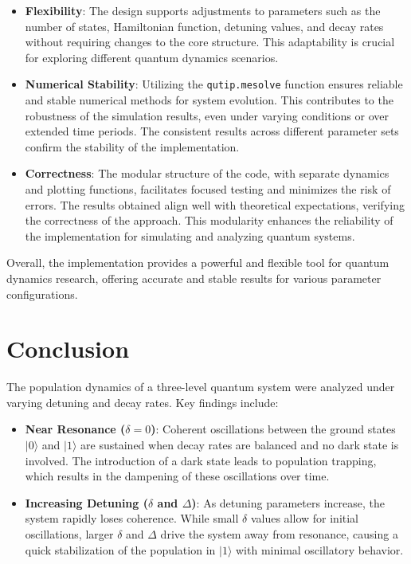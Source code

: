 \documentclass{article}
\begin{document}
\begin{itemize}
    \item \textbf{Flexibility}: The design supports adjustments to parameters such as the number of states, Hamiltonian function, detuning values, and decay rates without requiring changes to the core structure. This adaptability is crucial for exploring different quantum dynamics scenarios.
    
    \item \textbf{Numerical Stability}: Utilizing the \texttt{qutip.mesolve} function ensures reliable and stable numerical methods for system evolution. This contributes to the robustness of the simulation results, even under varying conditions or over extended time periods. The consistent results across different parameter sets confirm the stability of the implementation.
    
    \item \textbf{Correctness}: The modular structure of the code, with separate dynamics and plotting functions, facilitates focused testing and minimizes the risk of errors. The results obtained align well with theoretical expectations, verifying the correctness of the approach. This modularity enhances the reliability of the implementation for simulating and analyzing quantum systems.
\end{itemize}

Overall, the implementation provides a powerful and flexible tool for quantum dynamics research, offering accurate and stable results for various parameter configurations.

\section{Conclusion}

The population dynamics of a three-level quantum system were analyzed under varying detuning and decay rates. Key findings include:

\begin{itemize}
    \item \textbf{Near Resonance ($\delta = 0$)}: Coherent oscillations between the ground states $|0\rangle$ and $|1\rangle$ are sustained when decay rates are balanced and no dark state is involved. The introduction of a dark state leads to population trapping, which results in the dampening of these oscillations over time.
    
    \item \textbf{Increasing Detuning ($\delta$ and $\Delta$)}: As detuning parameters increase, the system rapidly loses coherence. While small $\delta$ values allow for initial oscillations, larger $\delta$ and $\Delta$ drive the system away from resonance, causing a quick stabilization of the population in $|1\rangle$ with minimal oscillatory behavior.
\end{itemize}
\end{document}

